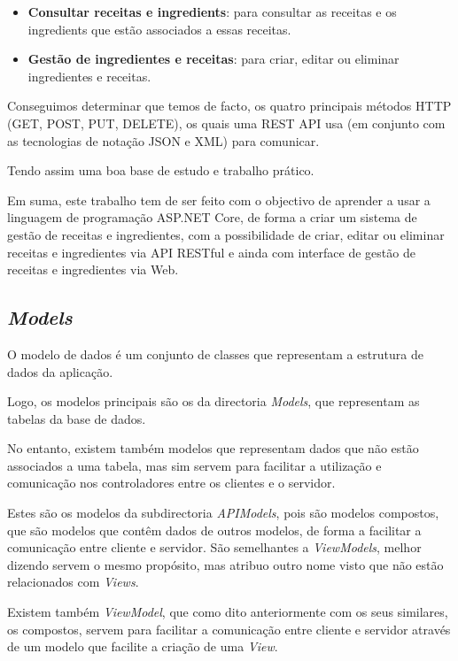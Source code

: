 \begin{itemize}
  \item \textbf{Consultar receitas e ingredients}: para consultar as receitas e os ingredients que estão associados a essas receitas.
  \item \textbf{Gestão de ingredientes e receitas}: para criar, editar ou eliminar ingredientes e receitas.
\end{itemize}

Conseguimos determinar que temos de facto, os quatro principais métodos HTTP (GET, POST, PUT, DELETE), os quais uma REST API usa (em conjunto com as tecnologias de notação JSON e XML) para comunicar.

Tendo assim uma boa base de estudo e trabalho prático.

Em suma, este trabalho tem de ser feito com o objectivo de aprender a usar a linguagem de programação ASP.NET Core, de forma a criar um sistema de gestão de receitas e ingredientes, com a possibilidade de criar, editar ou eliminar receitas e ingredientes via API RESTful e ainda com interface de gestão de receitas e ingredientes via Web.

\subsection{\textit{Models}}

O modelo de dados é um conjunto de classes que representam a estrutura de dados da aplicação.

Logo, os modelos principais são os da directoria \textit{Models}, que representam as tabelas da base de dados.

No entanto, existem também modelos que representam dados que não estão associados a uma tabela, mas sim servem para facilitar a utilização e comunicação nos controladores entre os clientes e o servidor.

Estes são os modelos da subdirectoria \textit{API}\/\textit{Models}, pois são modelos compostos, que são modelos que contêm dados de outros modelos, de forma a facilitar a comunicação entre cliente e servidor. São semelhantes a \textit{ViewModels}, melhor dizendo servem o mesmo propósito, mas atribuo outro nome visto que não estão relacionados com \textit{Views}.

Existem também \textit{ViewModel}, que como dito anteriormente com os seus similares, os compostos, servem para facilitar a comunicação entre cliente e servidor através de um modelo que facilite a criação de uma \textit{View}.


